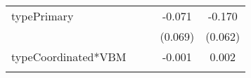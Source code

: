 \documentclass[12pt,twoside]{reedthesis}
\begin{document}
\begin{longtable}[]{@{}lcccc@{}}
\begin{minipage}[t]{0.23\columnwidth}
  typePrimary\strut
  \end{minipage} & \begin{minipage}[t]{0.14\columnwidth}\centering\strut
  \strut
  \end{minipage} & \begin{minipage}[t]{0.18\columnwidth}\centering\strut
  \strut
  \end{minipage} & \begin{minipage}[t]{0.20\columnwidth}\centering\strut
  -0.071\strut
  \end{minipage} & \begin{minipage}[t]{0.11\columnwidth}\centering\strut
  -0.170\strut
  \end{minipage}\tabularnewline
  \begin{minipage}[t]{0.23\columnwidth}\raggedright\strut
  \strut
  \end{minipage} & \begin{minipage}[t]{0.14\columnwidth}\centering\strut
  \strut
  \end{minipage} & \begin{minipage}[t]{0.18\columnwidth}\centering\strut
  \strut
  \end{minipage} & \begin{minipage}[t]{0.20\columnwidth}\centering\strut
  (0.069)\strut
  \end{minipage} & \begin{minipage}[t]{0.11\columnwidth}\centering\strut
  (0.062)\strut
  \end{minipage}\tabularnewline
  \begin{minipage}[t]{0.23\columnwidth}\raggedright\strut
  typeCoordinated*VBM\strut
  \end{minipage} & \begin{minipage}[t]{0.14\columnwidth}\centering\strut
  \strut
  \end{minipage} & \begin{minipage}[t]{0.18\columnwidth}\centering\strut
  \strut
  \end{minipage} & \begin{minipage}[t]{0.20\columnwidth}\centering\strut
  -0.001\strut
  \end{minipage} & \begin{minipage}[t]{0.11\columnwidth}\centering\strut
  0.002\strut
  \end{minipage}\tabularnewline
  \begin{minipage}[t]{0.23\columnwidth}\raggedright\strut
  \strut
  \end{minipage} & \begin{minipage}[t]{0.14\columnwidth}\centering\strut

\end{minipage}
\end{longtable}
\end{document}
